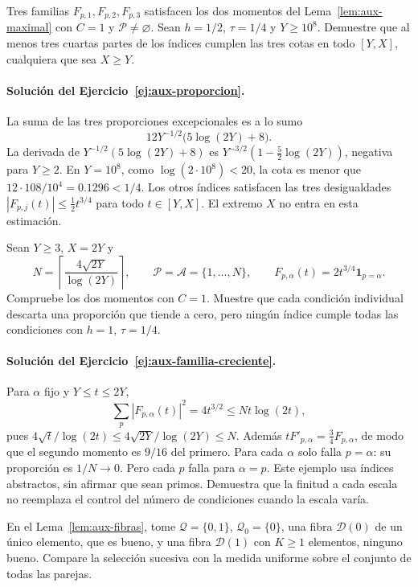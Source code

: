 \begin{ejercicio}\label{ej:aux-proporcion}
Tres familias $F_{p,1},F_{p,2},F_{p,3}$ satisfacen los dos momentos
del Lema~\ref{lem:aux-maximal} con $C=1$ y
$\mathcal P\ne\varnothing$. Sean $h=1/2$, $\tau=1/4$ y
$Y\ge10^8$. Demuestre que al menos tres cuartas partes de los
índices cumplen las tres cotas en todo $[Y,X]$, cualquiera que sea
$X\ge Y$.
\end{ejercicio}

\paragraph{Solución del Ejercicio~\ref{ej:aux-proporcion}.}
La suma de las tres proporciones excepcionales es a lo sumo
\[
 12Y^{-1/2}\bigl(5\log(2Y)+8\bigr).
\]
La derivada de $Y^{-1/2}(5\log(2Y)+8)$ es
$Y^{-3/2}(1-\tfrac52\log(2Y))$, negativa para $Y\ge2$.
En $Y=10^8$, como $\log(2\cdot10^8)<20$, la cota es menor que
$12\cdot108/10^4=0.1296<1/4$. Los otros índices satisfacen las
tres desigualdades $|F_{p,j}(t)|\le\tfrac12t^{3/4}$ para todo
$t\in[Y,X]$. El extremo $X$ no entra en esta estimación.

\begin{ejercicio}\label{ej:aux-familia-creciente}
Sean $Y\ge3$, $X=2Y$ y
\[
 N=\left\lceil\frac{4\sqrt{2Y}}{\log(2Y)}\right\rceil,
 \qquad \mathcal P=\mathcal A=\{1,\ldots,N\},
 \qquad F_{p,\alpha}(t)=2t^{3/4}\mathbf1_{p=\alpha}.
\]
Compruebe los dos momentos con $C=1$. Muestre que cada condición
individual descarta una proporción que tiende a cero, pero ningún
índice cumple todas las condiciones con $h=1$, $\tau=1/4$.
\end{ejercicio}

\paragraph{Solución del Ejercicio~\ref{ej:aux-familia-creciente}.}
Para $\alpha$ fijo y $Y\le t\le2Y$,
\[
 \sum_p|F_{p,\alpha}(t)|^2=4t^{3/2}
 \le Nt\log(2t),
\]
pues $4\sqrt t/\log(2t)\le4\sqrt{2Y}/\log(2Y)\le N$.
Además $tF'_{p,\alpha}=\tfrac34F_{p,\alpha}$, de modo que
el segundo momento es $9/16$ del primero. Para cada $\alpha$
solo falla $p=\alpha$: su proporción es $1/N\to0$.
Pero cada $p$ falla para $\alpha=p$. Este ejemplo usa índices
abstractos, sin afirmar que sean primos. Demuestra que la finitud
a cada escala no reemplaza el control del número de condiciones
cuando la escala varía.

\begin{ejercicio}\label{ej:aux-fibras}
En el Lema~\ref{lem:aux-fibras}, tome
$\mathcal Q=\{0,1\}$, $\mathcal Q_0=\{0\}$,
una fibra $\mathcal D(0)$ de un único elemento, que es bueno, y una fibra
$\mathcal D(1)$ con $K\ge1$ elementos, ninguno bueno.
Compare la selección sucesiva con la medida uniforme sobre
el conjunto de todas las parejas.
\end{ejercicio}


